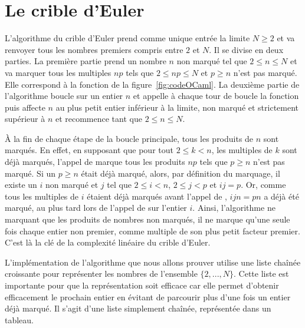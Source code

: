 \documentclass[a4paper]{easychair}
\begin{document}
\section{Le crible d'Euler}
\label{sec:algo}

L'algorithme du crible d'Euler prend comme unique entrée la limite $N \geq 2$ et va
renvoyer tous les nombres premiers compris entre $2$ et $N$. Il se divise en
deux parties. La première partie prend un nombre $n$ non marqué
tel que $2 \leq n \leq N$ et va marquer tous les multiples $np$ tels que
$2 \leq np \leq N$ et $p \geq n$ n'est pas marqué. Elle correspond à la fonction
 de la figure~\ref{fig:codeOCaml}.
La deuxième partie de l'algorithme boucle sur un entier $n$ et appelle à chaque
tour de boucle la fonction  puis affecte $n$ au plus
petit entier inférieur à la limite, non marqué et strictement supérieur à $n$
et recommence tant que $2 \leq n \leq N$.

À la fin de chaque étape de la boucle principale, tous les produits de $n$ sont
marqués. En effet, en supposant que pour tout $2 \leq k < n$, les multiples de $k$
sont déjà marqués, l'appel de  marque tous les produits
$np$ tels que $p \geq n$ n'est pas marqué. Si un $p \geq n$ était déjà marqué,
alors, par définition du marquage, il existe un $i$ non marqué et $j$ tel que
$2 \leq i < n$, $2 \leq j < p$ et $ij = p$. Or, comme tous les multiples de $i$
étaient déjà marqués avant l'appel de , $ijn = pn$
a déjà été marqué, au plus tard lors de l'appel de  sur
l'entier $i$.
Ainsi, l'algorithme ne marquant que les produits de nombres non marqués, il ne
marque qu'une seule fois chaque entier non premier, comme multiple de
son plus petit facteur premier. C'est là la clé de la complexité
linéaire du crible d'Euler.


L'implémentation de l'algorithme que nous allons prouver utilise une liste
chaînée croissante pour représenter les nombres de l'ensemble $\{2,...,N\}$.
Cette liste est importante pour que la représentation soit efficace car elle
permet d'obtenir efficacement le prochain entier
en évitant de parcourir plus d'une fois un entier déjà marqué.
Il s'agit d'une liste simplement chaînée, représentée dans un tableau.
\end{document}
